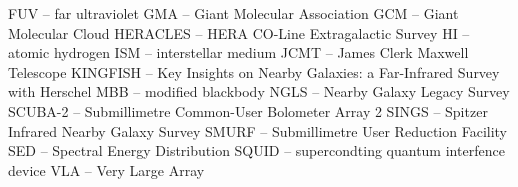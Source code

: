 FUV -- far ultraviolet
GMA -- Giant Molecular Association
GCM -- Giant Molecular Cloud
HERACLES -- HERA CO-Line Extragalactic Survey
HI -- atomic hydrogen
ISM -- interstellar medium
JCMT -- James Clerk Maxwell Telescope
KINGFISH -- Key Insights on Nearby Galaxies: a Far-Infrared Survey with Herschel
MBB -- modified blackbody
NGLS -- Nearby Galaxy Legacy Survey
SCUBA-2 -- Submillimetre Common-User Bolometer Array 2
SINGS -- Spitzer Infrared Nearby Galaxy Survey
SMURF -- Submillimetre User Reduction Facility
SED -- Spectral Energy Distribution
SQUID -- supercondting quantum interfence device
VLA -- Very Large Array
